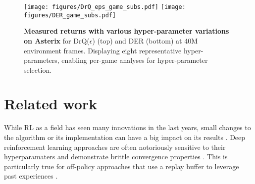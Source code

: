 \documentclass[10pt]{article} %
\begin{document}
\begin{figure}[!t]
    \centering
   \texttt{[image: figures/DrQ\_eps\_game\_subs.pdf]}
   \texttt{[image: figures/DER\_game\_subs.pdf]}
  
    \caption{\textbf{Measured returns with various hyper-parameter variations on Asterix} for DrQ($\epsilon$) (top) and DER (bottom) at 40M environment frames. Displaying eight representative hyper-parameters, enabling per-game analyses for hyper-parameter selection.}%
    \label{fig:per_game}%
    \vspace{-1em}
\end{figure}
% 
% 
\section{Related work}
\label{related_work}

While RL as a field has seen many innovations in the last
years, small changes to the algorithm or its implementation can have a big impact on its results \citep{engstrom2020implementation, joajo2021lifting}.  Deep reinforcement learning approaches are often notoriously sensitive to their hyperparamaters and demonstrate brittle convergence properties \citep{haarnoja2018soft}. This is particularly true for off-policy approaches that use a replay buffer to leverage past experiences \citep{duan2016benchmarking}.
\end{document}
